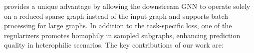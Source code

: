 \sgs provides a unique advantage by allowing the downstream GNN to operate solely on a reduced sparse graph instead of the input graph and supports batch processing for large graphs.
In addition to the task-specific loss, one of the regularizers promotes homophily in sampled subgraphs, enhancing prediction quality in heterophilic scenarios.
% 
% 
% 
The key contributions of our work are:
